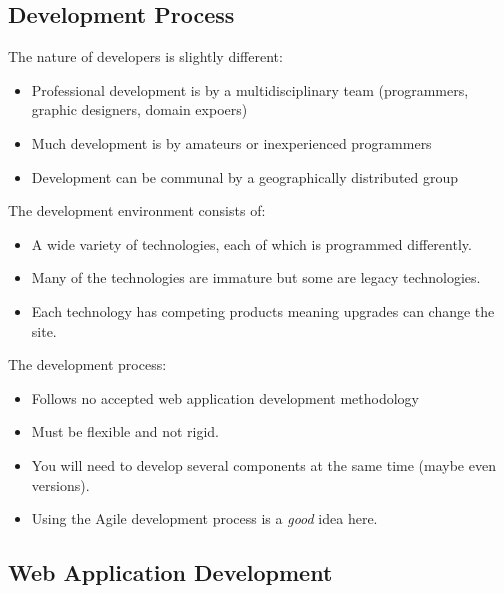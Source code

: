 \subsection{Development Process}\label{sub:development_process_was}

The nature of developers is slightly different:
\begin{itemize}
    \item Professional development is by a multidisciplinary team (programmers,  graphic designers, domain expoers)
    \item Much development is by amateurs or inexperienced programmers
    \item Development can be communal by a geographically distributed group
\end{itemize}
The development environment consists of:
\begin{itemize}
    \item A wide variety of technologies, each of which is programmed differently.
    \item Many of the technologies are immature but some are legacy technologies.
    \item Each technology has competing products meaning upgrades can change the site.
\end{itemize}
The development process:
\begin{itemize}
    \item Follows no accepted web application development methodology
    \item Must be flexible and not rigid.
    \item You will need to develop several components at the same time (maybe even versions).
    \item Using the Agile development process is a \emph{good} idea here.
\end{itemize}

\subsection{Web Application Development}\label{sub:web_application_development}

